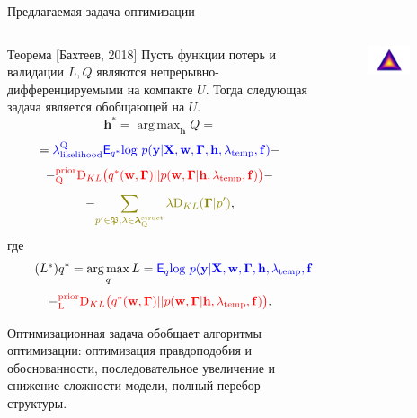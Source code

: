 \documentclass[10pt,pdf,utf8,russian,aspectratio=169]{beamer}
\DeclareMathOperator*{\argmax}{arg\,max}
\begin{document}
\begin{frame}{Предлагаемая задача оптимизации}

\footnotesize
\begin{columns}
\begin{column}{0.8\textwidth}
\begin{block}{Теорема [Бахтеев, 2018]}
Пусть функции потерь и валидации $L,Q$ являются непрерывно-дифференцируемыми на компакте $U$.
Тогда следующая задача является обобщающей на $U$.
\[
\mathbf{h}^{*} = \argmax_{\mathbf{h}} Q = 
\]
\[
= \textcolor{blue}{\lambda_\text{likelihood}^\text{Q}\mathsf{E}_{{q}^{*}} \text{log}~{p(\mathbf{y} | \mathbf{X}, \mathbf{w},\boldsymbol{\Gamma}, \mathbf{h}, \lambda_\text{temp}, \mathbf{f})}}
 -\]
\vspace{-0.3cm}
\[- \textcolor{red}{^\text{prior}_\text{Q}\text{D}_{KL}\bigl( q^{*}(\mathbf{w}, \boldsymbol{\Gamma}) || p(\mathbf{w}, \boldsymbol{\Gamma} |\mathbf{h}, \lambda_{\text{temp}},\mathbf{f}) \bigr)}  -\]
\vspace{-0.3cm}
\[
 - \textcolor{olive}{\sum_{p' \in \mathfrak{P}, \lambda \in \boldsymbol{\lambda}^\text{struct}_\text{Q}} \lambda\text{D}_{KL}(\boldsymbol{\Gamma} | p')}, 
\]
где 
\[
\tag{$L^{*}$}
{q}^{*} = \argmax_{q} L = 
\textcolor{blue}{\mathsf{E}_q \text{log}~{p(\mathbf{y} | \mathbf{X}, \mathbf{w}, \boldsymbol{\Gamma}, \mathbf{h}, \lambda_{\text{temp}}, \mathbf{f})}}
\]
\vspace{-0.3cm}
\[- \textcolor{red}{^\text{prior}_\text{L}\text{D}_{KL}\bigl( q^{*}(\mathbf{w}, \boldsymbol{\Gamma}) || p(\mathbf{w}, \boldsymbol{\Gamma} |\mathbf{h}, \lambda_{\text{temp}},\mathbf{f}) \bigr)}.
\]
\end{block}
Оптимизационная задача обобщает алгоритмы оптимизации: оптимизация правдоподобия и обоснованности, последовательное увеличение и снижение сложности модели, полный перебор структуры.
\end{column}
\begin{column}{0.2\textwidth}
\begin{figure}
\centering
\includegraphics[width=0.75\textwidth]{combinations_1.png}

\end{figure}
\end{column}
\end{columns}
\end{frame}
\end{document}

